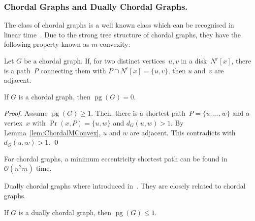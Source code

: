 \documentclass[10pt]{llncs}
\newcommand{\calO}{\mathcal{O}}
\DeclareMathOperator{\pg}{pg}
\begin{document}
\subsubsection{Chordal Graphs and Dually Chordal Graphs.}

The class of chordal graphs is a well known class which can be recognised in linear time~\cite{TarjanYannak1984}.
Due to the strong tree structure of chordal graphs, they have the following property known as $m$-convexity:

\begin{lemma}
     \label{lem:ChordalMConvex}
Let $G$ be a chordal graph.
If, for two distinct vertices~$u,v$ in a disk~$N^r[x]$, there is a path~$P$ connecting them with $P \cap N^r[x] = \{ u, v \}$, then $u$ and~$v$ are adjacent.
\end{lemma}

\begin{lemma}
If $G$ is a chordal graph, then $\pg(G) = 0$.
\end{lemma}

\begin{proof}
Assume $\pg(G) \geq 1$.
Then, there is a shortest path~$P = \{ u, \ldots, w \}$ and a vertex~$x$ with $\Pr(x, P) = \{ u, w \}$ and $d_G(u, w) > 1$.
By Lemma~\ref{lem:ChordalMConvex}, $u$ and $w$ are adjacent.
This contradicts with $d_G(u, w) > 1$.
\qed
\end{proof}

\begin{corollary}
For chordal graphs, a minimum eccentricity shortest path can be found in $\calO(n^2m)$ time.
\end{corollary}

Dually chordal graphs where introduced in~\cite{BraDraCheVol1998}.
They are closely related to chordal graphs.

\begin{lemma}
If $G$ is a dually chordal graph, then $\pg(G) \leq 1$.
\end{lemma}
\end{document}
